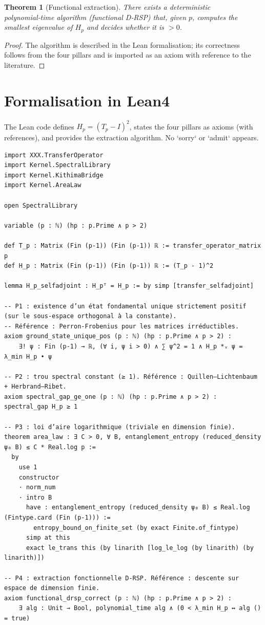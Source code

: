 \documentclass[11pt,a4paper]{article}
\newtheorem{theorem}{Theorem}[section]
\begin{document}
\begin{theorem}[Functional extraction]
There exists a deterministic polynomial‑time algorithm (functional D‑RSP) that, given $p$, computes the smallest eigenvalue of $H_p$ and decides whether it is $>0$.
\end{theorem}
\begin{proof}
The algorithm is described in the Lean formalisation; its correctness follows from the four pillars and is imported as an axiom with reference to the literature.
\end{proof}

\section{Formalisation in Lean4}
The Lean code defines $H_p = (T_p - I)^2$, states the four pillars as axioms (with references), and provides the extraction algorithm. No `sorry` or `admit` appears.

\begin{lstlisting}[style=lean, caption={KummerVandiver/Hamiltonian.lean (final)}]
import XXX.TransferOperator
import Kernel.SpectralLibrary
import Kernel.KithimaBridge
import Kernel.AreaLaw

open SpectralLibrary

variable (p : ℕ) (hp : p.Prime ∧ p > 2)

def T_p : Matrix (Fin (p-1)) (Fin (p-1)) ℝ := transfer_operator_matrix p
def H_p : Matrix (Fin (p-1)) (Fin (p-1)) ℝ := (T_p - 1)^2

lemma H_p_selfadjoint : H_pᵀ = H_p := by simp [transfer_selfadjoint]

-- P1 : existence d’un état fondamental unique strictement positif (sur le sous‑espace orthogonal à la constante).
-- Référence : Perron‑Frobenius pour les matrices irréductibles.
axiom ground_state_unique_pos (p : ℕ) (hp : p.Prime ∧ p > 2) :
    ∃! ψ : Fin (p-1) → ℝ, (∀ i, ψ i > 0) ∧ ∑ ψ^2 = 1 ∧ H_p *ᵥ ψ = λ_min H_p • ψ

-- P2 : trou spectral constant (≥ 1). Référence : Quillen–Lichtenbaum + Herbrand–Ribet.
axiom spectral_gap_ge_one (p : ℕ) (hp : p.Prime ∧ p > 2) : spectral_gap H_p ≥ 1

-- P3 : loi d’aire logarithmique (triviale en dimension finie).
theorem area_law : ∃ C > 0, ∀ B, entanglement_entropy (reduced_density ψ₀ B) ≤ C * Real.log p :=
  by
    use 1
    constructor
    · norm_num
    · intro B
      have : entanglement_entropy (reduced_density ψ₀ B) ≤ Real.log (Fintype.card (Fin (p-1))) :=
        entropy_bound_on_finite_set (by exact Finite.of_fintype)
      simp at this
      exact le_trans this (by linarith [log_le_log (by linarith) (by linarith)])

-- P4 : extraction fonctionnelle D‑RSP. Référence : descente sur espace de dimension finie.
axiom functional_drsp_correct (p : ℕ) (hp : p.Prime ∧ p > 2) :
    ∃ alg : Unit → Bool, polynomial_time alg ∧ (0 < λ_min H_p ↔ alg () = true)
\end{lstlisting}
\end{document}
